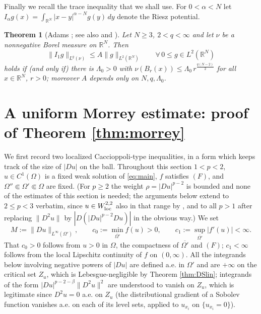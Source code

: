 \documentclass[reqno]{amsart}
\theoremstyle{plain}
\newtheorem{theorem}{Theorem}
\theoremstyle{definition}
\theoremstyle{remark}
\newcommand{\R}{\mathbb{R}}
\begin{document}
Finally we recall the trace inequality that we shall use. For $0<\alpha<N$ let
$I_\alpha g(x)=\int_{\R^N}|x-y|^{\alpha-N}g(y)\,dy$ denote the Riesz potential.

\begin{theorem}[Adams \cite{Adams73}; see also {\cite[Theorem 7.2.1]{AdamsHedberg}} and {\cite[\S1.4]{Mazya}}]\label{thm:adams}
Let $N\ge3$, $2<q<\infty$ and let $\nu$ be a nonnegative Borel measure on $\R^N$. Then
\[
\|I_1g\|_{L^q(\nu)}\le A\|g\|_{L^2(\R^N)}\qquad\forall\, 0\le g\in L^2(\R^N)
\]
holds if (and only if) there is $\Lambda_0>0$ with
$\nu(B_r(x))\le\Lambda_0\,r^{\frac{q(N-2)}{2}}$ for all $x\in\R^N$, $r>0$; moreover $A$ depends only
on $N,q,\Lambda_0$.
\end{theorem}

\section{A uniform Morrey estimate: proof of Theorem \ref{thm:morrey}}\label{sec:morrey}

We first record two localized Caccioppoli-type inequalities, in a form which keeps track of the
size of $|Du|$ on the ball. Throughout this section $1<p<2$, $u\in C^1(\Omega)$ is a fixed weak
solution of \eqref{eq:main}, $f$ satisfies $(F)$, and $\Omega''\Subset\Omega'\Subset\Omega$ are
fixed. (For $p\ge2$ the weight $\rho=|Du|^{p-2}$ is bounded and none of the estimates of this
section is needed; the arguments below extend to $2\le p<3$ verbatim, since $u\in W^{2,2}_{\rm loc}$
also in that range by \cite{DS1,Sci1}, and to all $p>1$ after replacing $\|D^2u\|$ by
$|D(|Du|^{p-2}Du)|$ in the obvious way.) We set
\[
M:=\|Du\|_{L^\infty(\Omega')},\qquad
c_0:=\min_{\overline{\Omega'}}f(u)>0,\qquad
c_1:=\sup_{\overline{\Omega'}}|f'(u)|<\infty .
\]
That $c_0>0$ follows from $u>0$ in $\Omega$, the compactness of $\overline{\Omega'}$ and $(F)$;
$c_1<\infty$ follows from the local Lipschitz continuity of $f$ on $(0,\infty)$. All the integrands
below involving negative powers of $|Du|$ are defined a.e. in $\Omega'$ and are $+\infty$ on the
critical set $Z_u$, which is Lebesgue-negligible by Theorem \ref{thm:DSlin}; integrands of the form
$|Du|^{p-2-\beta}\|D^2u\|^2$ are understood to vanish on $Z_u$, which is legitimate since
$D^2u=0$ a.e. on $Z_u$ (the distributional gradient of a Sobolev function vanishes a.e. on each of
its level sets, applied to $u_{x_i}$ on $\{u_{x_i}=0\}$).
\end{document}
